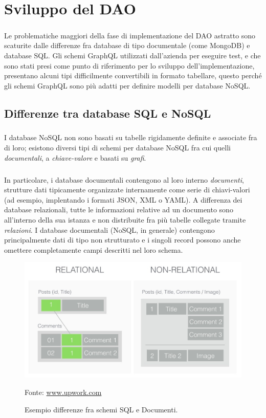 \documentclass[a4paper, 12pt]{report}
\newcommand{\source}[1]{\caption*{Fonte: {#1}}}
\begin{document}
  \chapter{Sviluppo del DAO}
    \paragraph*{}
    Le problematiche maggiori della fase di implementazione del DAO astratto sono scaturite dalle differenze fra database di tipo documentale (come MongoDB) e database SQL.
    Gli schemi GraphQL utilizzati dall'azienda per eseguire test, e che sono stati presi come punto di riferimento per lo sviluppo dell'implementazione, presentano alcuni tipi difficilmente convertibili in formato tabellare, questo perché gli schemi GraphQL sono
    più adatti per definire modelli per database NoSQL.
    \section{Differenze tra database SQL e NoSQL}
    \paragraph*{}
      I database NoSQL non sono basati su tabelle rigidamente definite e associate fra di loro; esistono diversi tipi di schemi per database NoSQL fra cui quelli \emph{documentali}, a \emph{chiave-valore} e basati su \emph{grafi}.
      \paragraph*{}
      In particolare, i database documentali contengono al loro interno \emph{documenti}, strutture dati tipicamente organizzate internamente come serie di chiavi-valori (ad esempio, implentando i formati JSON, XML o YAML).
      A differenza dei database relazionali, tutte le informazioni relative ad un documento sono all'interno della sua istanza e non distribuite fra più tabelle collegate tramite \emph{relazioni}.
      I database documentali (NoSQL, in generale) contengono principalmente dati di tipo non strutturato e i singoli record possono anche omettere completamente campi descritti nel loro schema.
      \begin{figure}[H]
        \includegraphics[width=\textwidth]{relational-documental.jpg}
        \caption{Esempio differenze fra schemi SQL e Documenti.}
        \source{\href{https://www.upwork.com/resources/sql-vs-nosql-databases-whats-the-difference/}{www.upwork.com}}
      \end{figure}
\end{document}
